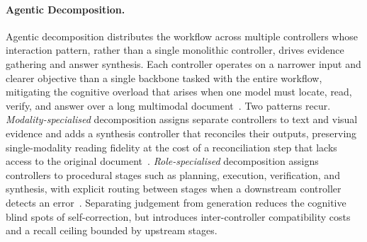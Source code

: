 \paragraph{Agentic Decomposition.} Agentic decomposition distributes the workflow across multiple controllers whose interaction pattern, rather than a single monolithic controller, drives evidence gathering and answer synthesis. Each controller operates on a narrower input and clearer objective than a single backbone tasked with the entire workflow, mitigating the cognitive overload that arises when one model must locate, read, verify, and answer over a long multimodal document~\cite{yu2025visual}. Two patterns recur. \textit{Modality-specialised} decomposition assigns separate controllers to text and visual evidence and adds a synthesis controller that reconciles their outputs, preserving single-modality reading fidelity at the cost of a reconciliation step that lacks access to the original document~\cite{han2025mdocagent, duan2025m2rag}. \textit{Role-specialised} decomposition assigns controllers to procedural stages such as planning, execution, verification, and synthesis, with explicit routing between stages when a downstream controller detects an error~\cite{yu2025visual, sun2025docagent}. Separating judgement from generation reduces the cognitive blind spots of self-correction, but introduces inter-controller compatibility costs and a recall ceiling bounded by upstream stages.

